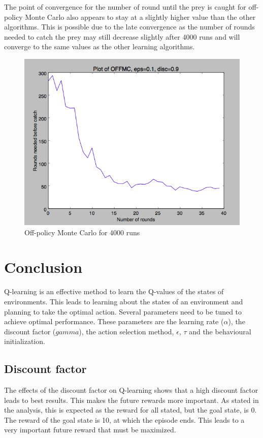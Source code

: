 \documentclass{article}
\begin{document}
The point of convergence for the number of round until the prey is caught for off-policy Monte Carlo also appears to stay at a slightly higher value than the other algorithms. This is possible due to the late convergence as the number of rounds needed to catch the prey may  still decrease slightly after 4000 runs and will converge to the same values as the other learning algorithms.

\begin{figure}[h]
\begin{center}
\includegraphics[scale=0.5]{OFFMC_11x11_preyat_5x5}
\caption{Off-policy Monte Carlo for 4000 runs}
\label{fig:offmc}
\end{center}
\end{figure}

\pagebreak
\section{Conclusion}
Q-learning is an effective method to learn the Q-values of the states of environments. This leads to learning about the states of an environment and planning to take the optimal action. Several parameters need to be tuned to achieve optimal performance. These parameters are the learning rate  ($\alpha$), the discount factor ($gamma$), the action selection method, $\epsilon$, $\tau$ and the behavioural initialization. 

\subsection{Discount factor}
The effects of the discount factor on Q-learning shows that a high discount factor leads to best results. This makes the future rewards more important. As stated in the analysis, this is expected as the reward for all stated, but the goal state, is 0. The reward of the goal state is 10, at which the episode ends. This leads to a very important future reward that must be maximized.
\end{document}
